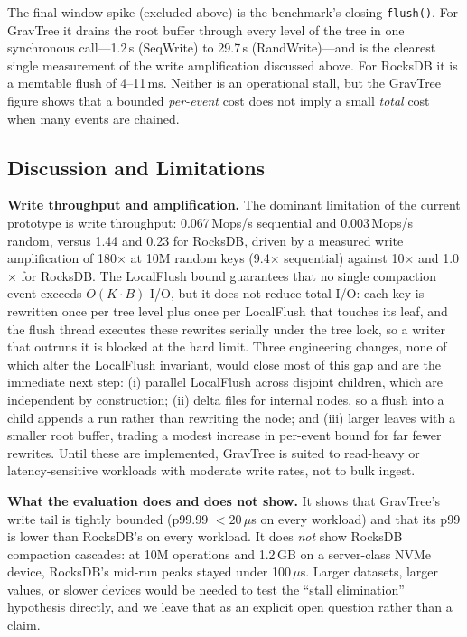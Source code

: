 \documentclass[10pt,twocolumn]{article}
\begin{document}
The final-window spike (excluded above) is the benchmark's closing
\texttt{flush()}.  For GravTree it drains the root buffer through every
level of the tree in one synchronous call---1.2\,s (SeqWrite) to 29.7\,s
(RandWrite)---and is the clearest single measurement of the write
amplification discussed above.  For RocksDB it is a memtable flush of
4--11\,ms.  Neither is an operational stall, but the GravTree figure shows
that a bounded \emph{per-event} cost does not imply a small \emph{total}
cost when many events are chained.

\subsection{Discussion and Limitations}
\label{sec:limits}

\textbf{Write throughput and amplification.}  The dominant limitation of the
current prototype is write throughput: 0.067\,Mops/s sequential and
0.003\,Mops/s random, versus 1.44 and 0.23 for RocksDB, driven by a
measured write amplification of 180$\times$ at 10M random keys (9.4$\times$
sequential) against 10$\times$ and 1.0$\times$ for RocksDB.  The LocalFlush
bound guarantees that no single compaction event exceeds $O(K \cdot B)$ I/O,
but it does not reduce total I/O: each key is rewritten once per tree level
plus once per LocalFlush that touches its leaf, and the flush thread executes
these rewrites serially under the tree lock, so a writer that outruns it is
blocked at the hard limit.  Three engineering changes, none of which alter
the LocalFlush invariant, would close most of this gap and are the immediate
next step: (i) parallel LocalFlush across disjoint children, which are
independent by construction; (ii) delta files for internal nodes, so a flush
into a child appends a run rather than rewriting the node; and (iii) larger
leaves with a smaller root buffer, trading a modest increase in per-event
bound for far fewer rewrites.  Until these are implemented, GravTree is
suited to read-heavy or latency-sensitive workloads with moderate write
rates, not to bulk ingest.

\textbf{What the evaluation does and does not show.}  It shows that
GravTree's write tail is tightly bounded (p99.99 $< 20\,\mu$s on every
workload) and that its p99 is lower than RocksDB's on every workload.  It
does \emph{not} show RocksDB compaction cascades: at 10M operations and
1.2\,GB on a server-class NVMe device, RocksDB's mid-run peaks stayed under
100\,$\mu$s.  Larger datasets, larger values, or slower devices would be
needed to test the ``stall elimination'' hypothesis directly, and we leave
that as an explicit open question rather than a claim.
\end{document}
